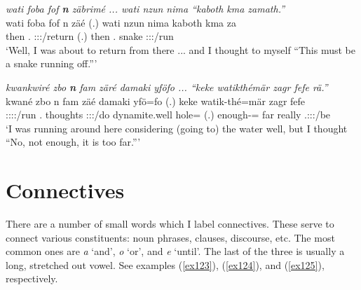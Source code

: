 \begin{exe}
	\ex \emph{wati foba fof \textbf{n} zäbrimé ... wati nzun nima ``kaboth kma zamath.''}\\
	\gll wati foba fof n zäé (.) wati nzun nima kaboth kma za\\
	then {\Dist}.{\Abl} {\Emph} {\Imn} \Fsg:\Sbj:\Rpst:\Pfv/return (.) then \Fsg{}.{\Dat} {\Quot} snake {\Pot} \Stsg:\Sbj:\Rpst:\Pfv/run\\
	\trans `Well, I was about to return from there ... and I thought to myself ``This must be a snake running off.''' 
	\label{ex121}
\end{exe}
\begin{exe}
	\ex \emph{kwankwiré zbo \textbf{n} fam zäré damaki yföfo ... ``keke watikthémär zagr fefe rä.''}\\
	\gll kwané zbo n fam zäé damaki yfö=fo (.) keke watik-thé=mär zagr fefe \\
	\Fsg:\Sbj:\Nonpast:\Ipfv:\Venit/run {\Prox}.{\All} {\Imn} thoughts \Fsg:\Sbj:\Rpst:\Pfv/do dynamite.well hole={\All} (.) {\Neg} enough-{\Adlzr}={\Priv} far really \Tsg.\F:\Sbj:\Nonpast:\Ipfv/be\\
	\trans `I was running around here considering (going to) the water well, but I thought ``No, not enough, it is too far.''' 
	\label{ex122}
\end{exe}

\section{Connectives} \label{connectives-sec}

There are a number of small words which I label connectives. These serve to connect various constituents: noun phrases, clauses, discourse, etc. The most common ones are \emph{a} `and', \emph{o} `or', and \emph{e} `until'. The last of the three is usually a long, stretched out vowel. See examples (\ref{ex123}), (\ref{ex124}), and (\ref{ex125}), respectively.


